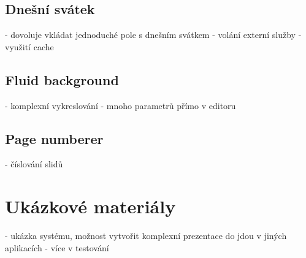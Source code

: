 \subsection{Dnešní svátek}

- dovoluje vkládat jednoduché pole s dnešním svátkem
- volání externí služby
- využití cache

\subsection{Fluid background}

- komplexní vykreslování
- mnoho parametrů přímo v editoru

\subsection{Page numberer}

- číslování slidů

\section{Ukázkové materiály}

- ukázka systému, možnost vytvořit komplexní prezentace do jdou v jiných aplikacích
- více v testování